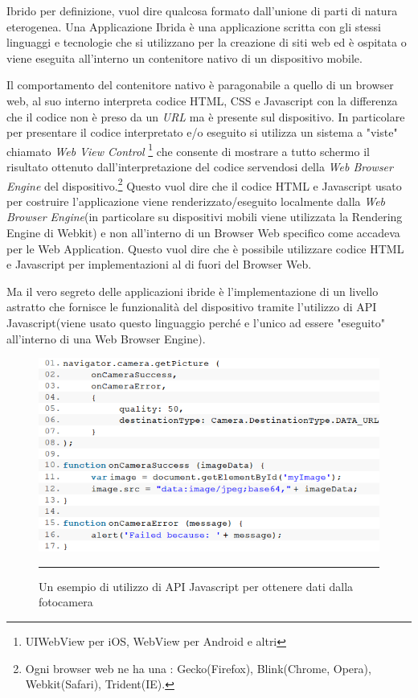 Ibrido per definizione, vuol dire qualcosa formato dall'unione di parti di natura eterogenea. Una Applicazione Ibrida è una applicazione scritta con gli stessi linguaggi e tecnologie che si utilizzano per la creazione di siti web ed è ospitata o viene eseguita all'interno un contenitore nativo di un dispositivo mobile. 

Il comportamento del contenitore nativo è paragonabile a quello di un browser web, al suo interno interpreta codice HTML, CSS e Javascript con la differenza che il codice non è preso da un \emph{URL} ma è presente sul dispositivo. In particolare per presentare il codice interpretato e/o eseguito si utilizza un sistema a "viste" chiamato \emph{Web View Control} \footnote{UIWebView per iOS, WebView per Android e altri} che consente di mostrare a tutto schermo il risultato ottenuto dall'interpretazione del codice servendosi della \emph{Web Browser Engine} del dispositivo.\footnote{Ogni browser web ne ha una : Gecko(Firefox), Blink(Chrome, Opera), Webkit(Safari), Trident(IE).}
Questo vuol dire che il codice HTML e Javascript usato per costruire l'applicazione viene renderizzato/eseguito localmente dalla \emph{Web Browser Engine}(in particolare su dispositivi mobili viene utilizzata la Rendering Engine di Webkit) e non all'interno di un Browser Web specifico come accadeva per le Web Application. Questo vuol dire che è possibile utilizzare codice HTML e Javascript per implementazioni al di fuori del Browser Web.

Ma il vero segreto delle applicazioni ibride è l'implementazione di un livello astratto che fornisce le funzionalità del dispositivo tramite l'utilizzo di API Javascript(viene usato questo linguaggio perché e l'unico ad essere "eseguito" all'interno di una Web Browser Engine). 

\begin{figure}[htbp]
  \centering
    \includegraphics[scale=0.75]{Figures/exampleCordova.png} 
    \rule{35em}{0.5pt}
  \caption[Javascript API]{Un esempio di utilizzo di API Javascript per ottenere dati dalla fotocamera}
  \label{fig:Javascript API Example}
\end{figure}

